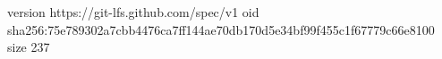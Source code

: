version https://git-lfs.github.com/spec/v1
oid sha256:75e789302a7cbb4476ca7ff144ae70db170d5e34bf99f455c1f67779c66e8100
size 237

